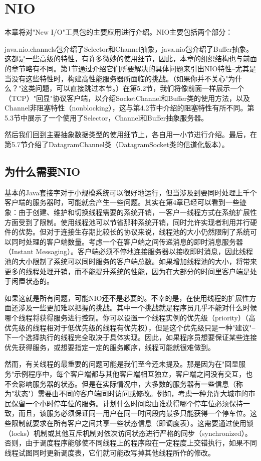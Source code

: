 \chapter{NIO} 

	本章将对"New I/O"工具包的主要应用进行介绍。NIO主要包括两个部分：

	java.nio.channels包介绍了Selector和Channel抽象，java.nio包介绍了Buffer抽象。这都是一些高级的特性，有许多微妙的使用细节，因此，本章的组织结构也与前面的章节略有不同。第1节通过介绍它们所要解决的具体问题来引出NIO特性--尤其是当没有这些特性时，构建高性能服务器所面临的挑战。（如果你并不关心"为什么？"这类问题，可以直接跳过本节。）在第5.2节，我们将像前面一样展示一个（TCP）"回显"协议客户端，以介绍SocketChannel和Buffer类的使用方法，以及Channel非阻塞特性（nonblocking），这与第4.2节中介绍的阻塞特性有所不同。第5.3节中展示了一个使用了Selector，Channel和Buffer抽象服务器。

	然后我们回到主要抽象数据类型的使用细节上，各自用一小节进行介绍。最后，在第5.7节介绍了DatagramChannel类（DatagramSocket类的信道化版本）。 

\section{为什么需要NIO} 

	基本的Java套接字对于小规模系统可以很好地运行，但当涉及到要同时处理上千个客户端的服务器时，可能就会产生一些问题。其实在第4章已经可以看到一些迹象：由于创建、维护和切换线程需要的系统开销，一客户一线程方式在系统扩展性方面受到了限制。使用线程池可以节省那种系统开销，同时允许实现者利用并行硬件的优势。但对于连接生存期比较长的协议来说，线程池的大小仍然限制了系统可以同时处理的客户端数量。考虑一个在客户端之间传递消息的即时消息服务器（Instant Messaging）。客户端必须不停地连接服务器以接收即时消息，因此线程池的大小限制了系统可以同时服务的客户端总数。如果增加线程池的大小，将带来更多的线程处理开销，而不能提升系统的性能，因为在大部分的时间里客户端是处于闲置状态的。 

	如果这就是所有问题，可能NIO还不是必要的。不幸的是，在使用线程的扩展性方面还涉及一些更加难以把握的挑战。其中一个挑战就是程序员几乎不能对什么时候哪个线程将获得服务进行控制。你可以设置一个线程实例的优先级（priority）（高优先级的线程相对于低优先级的线程有优先权），但是这个优先级只是一种"建议"--下一个选择执行的线程完全取决于具体实现。因此，如果程序员想要保证某些连接优先获得服务，或想要指定一定的服务顺序，线程可能就很难做到。

	然而，有关线程的最重要的问题可能是我们至今还未提及。那是因为在"回显服务"示例程序中，每个客户端都与其他客户端相互独立，客户端之间没有交互，也不会影响服务器的状态。但是在实际情况中，大多数的服务器有一些信息（称为"状态"）需要由不同的客户端同时访问或修改。例如，考虑一种允许大城市的市民保留一个小时停车位的服务。计划什么时间段由谁获得哪个停车位必须保持一致，而且，该服务必须保证同一用户在同一时间段内最多只能获得一个停车位。这些限制就要求在所有客户之间共享一些状态信息（即调度表）。这需要通过使用锁（locks）机制或其他互斥机制对依次访问状态进行严格的同步（synchronized）。否则，由于调度程序能够使不同线程上的程序段在一定程度上交错执行，如果不同线程试图同时更新调度表，它们就可能改写掉其他线程所作的修改。 

